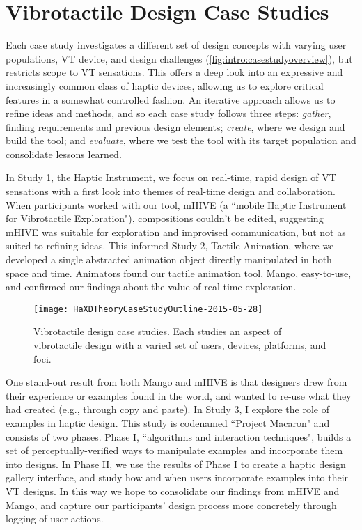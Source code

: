 \section{Vibrotactile Design Case Studies}

Each case study investigates a different set of design concepts with varying user populations, VT device, and design challenges (\autoref{fig:intro:casestudyoverview}), but restricts scope to VT sensations.
This offers a deep look into an expressive and increasingly common class of haptic devices, allowing us to explore critical features in a somewhat controlled fashion.
An iterative approach allows us to refine ideas and methods, and so each case study follows three steps: \emph{gather}, finding requirements and previous design elements; \emph{create}, where we design and build the tool; and \emph{evaluate}, where we test the tool with its target population and consolidate lessons learned.

In Study 1, the Haptic Instrument, we focus on real-time, rapid design of VT sensations with a first look into themes of real-time design and collaboration.
When participants worked with our tool, mHIVE (a ``mobile Haptic Instrument for Vibrotactile Exploration"), compositions couldn't be edited, suggesting mHIVE was suitable for exploration and improvised communication, but not as suited to refining ideas.
This informed Study 2, Tactile Animation, where we developed a single abstracted animation object directly manipulated in both space and time.
Animators found our tactile animation tool, Mango, easy-to-use, and confirmed our findings about the value of real-time exploration.


\begin{figure}[htbp]
\begin{center}
\texttt{[image: HaXDTheoryCaseStudyOutline-2015-05-28]}
\caption{Vibrotactile design case studies. Each studies an aspect of vibrotactile design with a varied set of users, devices, platforms, and foci.}
\label{fig:intro:casestudyoverview}
\end{center}
\end{figure}

One stand-out result from both Mango and mHIVE is that designers drew from their experience or examples found in the world, and wanted to re-use what they had created (e.g., through copy and paste).
In Study 3, I explore the role of examples in haptic design.
This study is codenamed ``Project Macaron" and consists of two phases.
Phase I, ``algorithms and interaction techniques", builds a set of perceptually-verified ways to manipulate examples and incorporate them into designs.
In Phase II, we use the results of Phase I to create a haptic design gallery interface, and study how and when users incorporate examples into their VT designs.
In this way we hope to consolidate our findings from mHIVE and Mango, and capture our participants' design process more concretely through logging of user actions.

